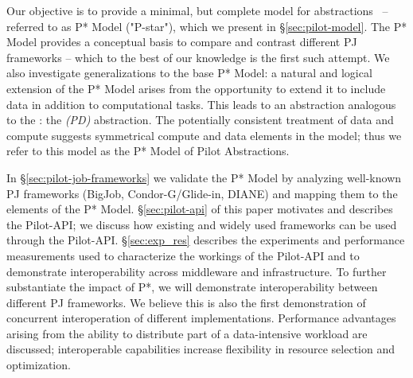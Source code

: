 \documentclass[conference]{IEEEtran}
\begin{document}



Our objective is to provide a minimal, but complete model for \pilot
abstractions~\cite{pstar-2012} -- referred to as P* Model ("P-star"),
which we present in \S\ref{sec:pilot-model}. The P* Model provides a
conceptual basis to compare and contrast different PJ frameworks --
which to the best of our knowledge is the first such attempt.  We also
investigate generalizations to the base P* Model: a natural and
logical extension of the P* Model arises from the opportunity to
extend it to include data in addition to computational tasks. This
leads to an abstraction analogous to the \pilotjob: the
\emph{\pilotdata (PD)} abstraction. The potentially consistent
treatment of data and compute suggests symmetrical compute and data
elements in the model; thus we refer to this model as the P* Model of
Pilot Abstractions.


In \S\ref{sec:pilot-job-frameworks} we validate the P* Model by
analyzing well-known PJ frameworks (BigJob, Condor-G/Glide-in, DIANE)
and mapping them to the elements of the P* Model. \S\ref{sec:pilot-api} of this paper motivates
and describes the Pilot-API; we discuss how existing and widely used
\pilotjob frameworks can be used through the
Pilot-API. \S\ref{sec:exp_res} describes the experiments and
performance measurements used to characterize the workings of the
Pilot-API and to demonstrate interoperability across middleware and
infrastructure. %
To further substantiate the impact of P*, we will demonstrate
interoperability between different PJ frameworks. %
We believe this is also the first demonstration of concurrent
interoperation of different \pilotjob implementations. Performance
advantages arising from the ability to distribute part of a
data-intensive workload are discussed; interoperable capabilities
increase flexibility in resource selection and optimization.
\end{document}

